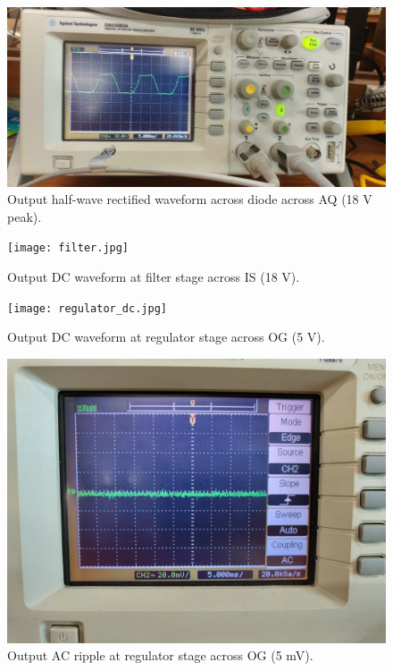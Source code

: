 \documentclass[journal,12pt,twocolumn]{IEEEtran}
\begin{document}
	\begin{figure}[!ht]
		\includegraphics[width=\columnwidth]{rectifier.jpg}
		\caption{Output half-wave rectified waveform across diode across AQ (18 V peak).}
		\label{fig:rectifier}
	\end{figure}
	
	\begin{figure}[!ht]
		\texttt{[image: filter.jpg]}
		\caption{Output DC waveform at filter stage across IS (18 V).}
		\label{fig:filter}
	\end{figure}
	
	\begin{figure}[!ht]
		\texttt{[image: regulator\_dc.jpg]}
		\caption{Output DC waveform at regulator stage across OG (5 V).}
		\label{fig:regulator_dc}
	\end{figure}
	
	\begin{figure}[!ht]
		\includegraphics[width=\columnwidth]{regulator_ac.jpg}
		\caption{Output AC ripple at regulator stage across OG (5 mV).}
		\label{fig:regulator_ac}
	\end{figure}
	
\end{document}
